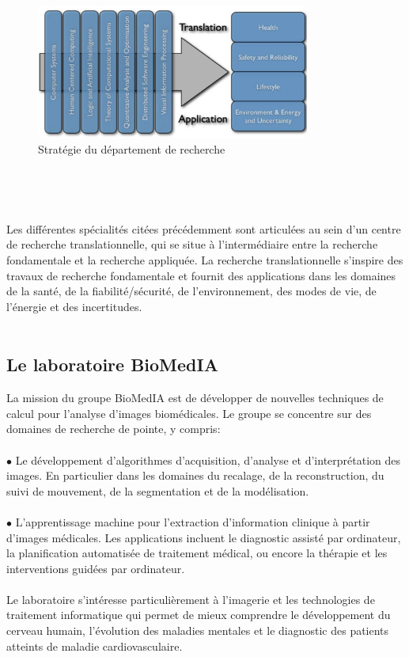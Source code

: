 \documentclass[10pt]{report}
\begin{document}
	\begin{figure}
		\includegraphics[width=9cm]{Reports/figures/research_strategy.jpg}
		\caption{Stratégie du département de recherche}
		\label{Stratégie du département de recherche}
	\end{figure}~\par~\par
	
	Les différentes spécialités citées précédemment sont articulées au sein d'un centre de recherche translationnelle, qui se situe à l'intermédiaire entre la recherche fondamentale et la recherche appliquée. La recherche translationnelle s'inspire des travaux de recherche fondamentale et fournit des applications dans les domaines de la santé, de la fiabilité/sécurité, de l'environnement, des modes de vie, de l'énergie et des incertitudes.
	\\
	\\
	\subsection{Le laboratoire BioMedIA}

	La mission du groupe BioMedIA est de développer de nouvelles techniques de
	calcul pour l'analyse d'images biomédicales. Le groupe se concentre sur des
	domaines de recherche de pointe, y compris:\\
	\\{$\bullet$} Le développement d'algorithmes d'acquisition, d'analyse et d'interprétation des images. En particulier dans les domaines du recalage, de la reconstruction,
	du suivi de mouvement, de la segmentation et de la modélisation. \\
	\\{$\bullet$} L'apprentissage machine pour l'extraction d'information clinique à partir
	d'images médicales. Les applications incluent le diagnostic assisté par
	ordinateur, la planification automatisée de traitement médical, ou encore la thérapie et les interventions guidées par ordinateur. \\
	\\Le laboratoire s'intéresse particulièrement à l'imagerie et les technologies de
	traitement informatique qui permet de mieux comprendre le
	développement du cerveau humain, l’évolution des maladies mentales et le
	diagnostic des patients atteints de maladie cardiovasculaire.
	
\end{document}
